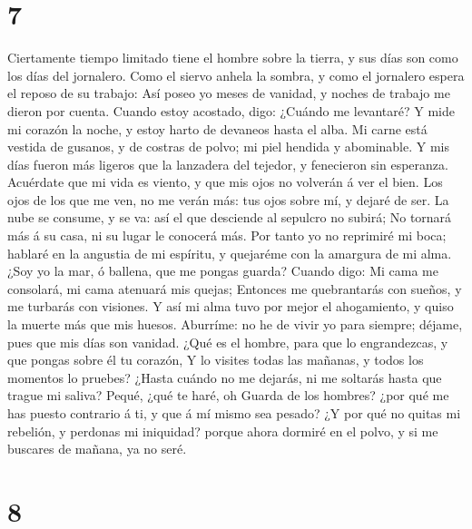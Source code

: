 \hypertarget{section-6}{%
\section{7}\label{section-6}}

 Ciertamente tiempo limitado tiene el hombre sobre la
tierra, y sus días son como los días del jornalero.  Como
el siervo anhela la sombra, y como el jornalero espera el reposo de su
trabajo:  Así poseo yo meses de vanidad, y noches de
trabajo me dieron por cuenta.  Cuando estoy acostado,
digo: ¿Cuándo me levantaré? Y mide mi corazón la noche, y estoy harto de
devaneos hasta el alba.  Mi carne está vestida de gusanos,
y de costras de polvo; mi piel hendida y abominable.  Y
mis días fueron más ligeros que la lanzadera del tejedor, y fenecieron
sin esperanza.  Acuérdate que mi vida es viento, y que mis
ojos no volverán á ver el bien.  Los ojos de los que me
ven, no me verán más: tus ojos sobre mí, y dejaré de ser. 
La nube se consume, y se va: así el que desciende al sepulcro no subirá;
 No tornará más á su casa, ni su lugar le conocerá más.
 Por tanto yo no reprimiré mi boca; hablaré en la
angustia de mi espíritu, y quejaréme con la amargura de mi alma.
 ¿Soy yo la mar, ó ballena, que me pongas guarda?
 Cuando digo: Mi cama me consolará, mi cama atenuará mis
quejas;  Entonces me quebrantarás con sueños, y me
turbarás con visiones.  Y así mi alma tuvo por mejor el
ahogamiento, y quiso la muerte más que mis huesos. 
Aburríme: no he de vivir yo para siempre; déjame, pues que mis días son
vanidad.  ¿Qué es el hombre, para que lo engrandezcas, y
que pongas sobre él tu corazón,  Y lo visites todas las
mañanas, y todos los momentos lo pruebes?  ¿Hasta cuándo
no me dejarás, ni me soltarás hasta que trague mi saliva?
 Pequé, ¿qué te haré, oh Guarda de los hombres? ¿por qué
me has puesto contrario á ti, y que á mí mismo sea pesado?
 ¿Y por qué no quitas mi rebelión, y perdonas mi
iniquidad? porque ahora dormiré en el polvo, y si me buscares de mañana,
ya no seré.

\hypertarget{section-7}{%
\section{8}\label{section-7}}

